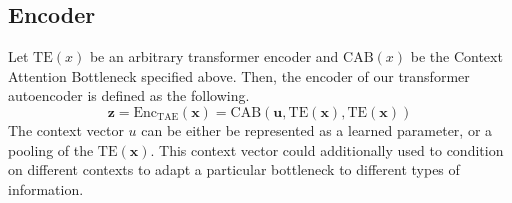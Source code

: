 

\subsection{Encoder}
Let $\text{TE}(x)$ be an arbitrary transformer encoder and $\text{CAB}(x)$ be the Context Attention Bottleneck specified above. Then, the encoder of our transformer autoencoder is defined as the following.
$$\mathbf{z} = \text{Enc}_{\text{TAE}}(\mathbf{x}) = \text{CAB}(\mathbf{u}, \text{TE}(\mathbf{x}), \text{TE}(\mathbf{x}))$$
The context vector $u$ can be either be represented as a learned parameter, or a pooling of the $\text{TE}(\mathbf{x})$. This context vector could additionally used to condition on different contexts to adapt a particular bottleneck to different types of information.

